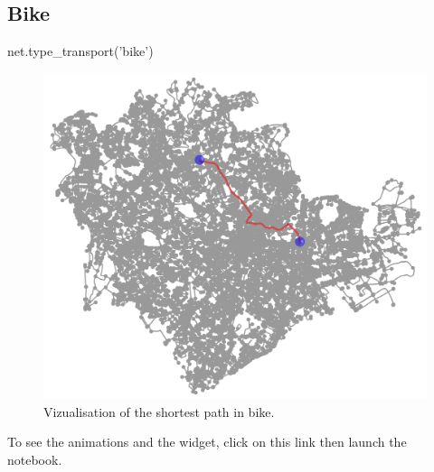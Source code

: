 \documentclass[11pt, compress]{beamer}
\theoremstyle{definition}
\begin{document}
\subsection{Bike}
\begin{frame}{}
\begin{block}{}
net.type\_transport('bike')
\end{block}  
\begin{figure}[H]
    \centering
    \includegraphics[scale=.4]{bike.png}
    \caption{Vizualisation of the shortest path in bike.}
    \label{fig:bike}
\end{figure}

To see the animations and the widget, click on this link \href{https://github.com/fanchonherman/project_network/tree/master/report}{} then launch the notebook.

\end{frame}
\end{document}
